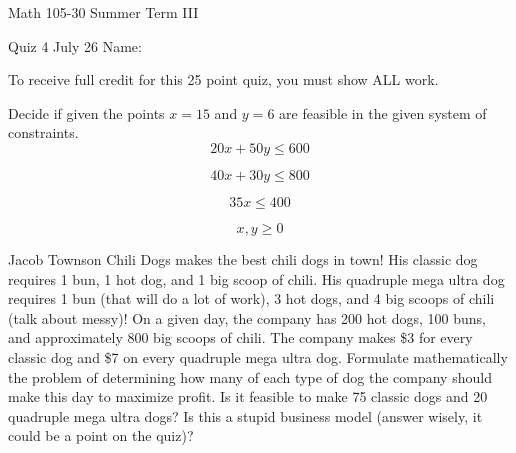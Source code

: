 \documentclass[11pt,epsfig]{article}
\begin{document}
Math 105-30 Summer Term III 

Quiz 4 July 26 \hspace{1.9in} {Name:} {\underline {\hspace{3.5in}}}
\vspace{1pc}

To receive full credit for this 25 point quiz, you must show ALL work.
\vspace{1pc}

\begin{problem}{10}
Decide if given the points $x=15$ and $y=6$ are feasible in the given system of constraints. 
\begin{equation*}
20x+50y \leq 600
\end{equation*}

\begin{equation*}
40x+30y \leq 800
\end{equation*}

\begin{equation*}
35x \leq 400
\end{equation*}

\begin{equation*}
x,y \geq 0
\end{equation*}

\vfill
\end{problem}


\newpage

\begin{problem}{15}
Jacob Townson Chili Dogs makes the best chili dogs in town! His classic dog requires 1 bun, 1 hot dog, and 1 big scoop of chili. His quadruple mega ultra dog requires 1 bun (that will do a lot of work), 3 hot dogs, and 4 big scoops of chili (talk about messy)! On a given day, the company has 200 hot dogs, 100 buns, and approximately 800 big scoops of chili. The company makes \$3 for every classic dog and \$7 on every  quadruple mega ultra dog. Formulate mathematically the problem of determining how many of each type of dog the company should make this day to maximize profit. Is it feasible to make 75 classic dogs and 20  quadruple mega ultra dogs? Is this a stupid business model (answer wisely, it could be a point on the quiz)?

\vfill
\end{problem}



\showpoints
\end{document}
